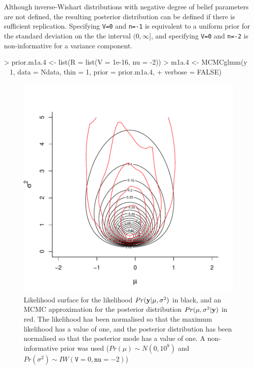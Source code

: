 \documentclass{article}
\begin{document}
Although inverse-Wishart distributions with negative degree of belief parameters are not defined, the resulting posterior distribution can be defined if there is sufficient replication. Specifying \texttt{V=0} and \texttt{n=-1} is equivalent to a uniform prior for the standard deviation on the the interval $(0,\infty]$, and specifying \texttt{V=0} and \texttt{n=-2} is non-informative for a variance component.

\begin{Schunk}
\begin{Sinput}
> prior.m1a.4 <- list(R = list(V = 1e-16, nu = -2))
> m1a.4 <- MCMCglmm(y ~ 1, data = Ndata, thin = 1, prior = prior.m1a.4, 
+     verbose = FALSE)
\end{Sinput}
\end{Schunk}


\iftalk
\else
\fi

\begin{figure}[!h]
\begin{center}
\includegraphics{Lecture1-071}
\end{center}
\caption{Likelihood surface for the likelihood $Pr({\bf y}|\mu, \sigma^{2})$ in black, and an MCMC approximation for the posterior distribution $Pr(\mu, \sigma^{2} | {\bf y})$ in red.  The likelihood has been normalised so that the maximum likelihood has a value of one, and the posterior distribution has been normalised so that the posterior mode has a value of one. A non-informative prior was used ($Pr(\mu)\sim N(0, 10^8)$ and  $Pr(\sigma^{2})\sim IW(\texttt{V}=0, \texttt{nu}=-2)$)}
\label{Psurfaceb-fig}
\end{figure}
\end{document}
